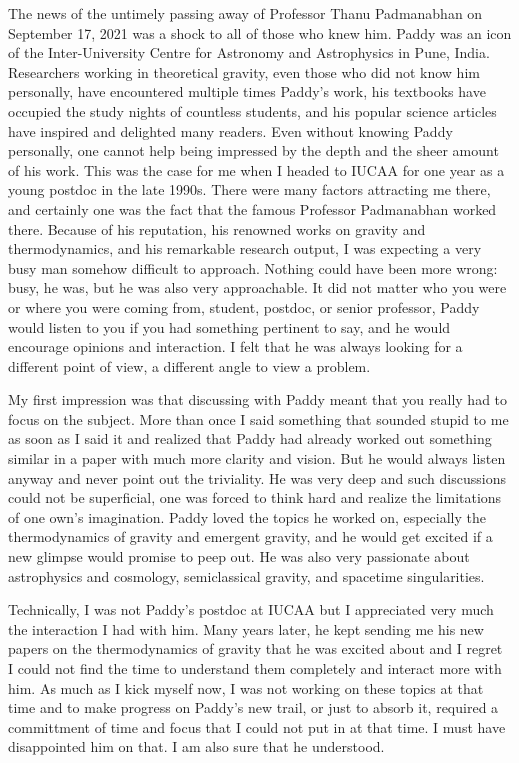 \documentclass[prd, preprint, longbibliography, 12pt]{revtex4-2}
\begin{document}
The news of the untimely passing away of Professor Thanu 
Padmanabhan  on 
September 17, 2021 was a shock to all 
of those who knew him. Paddy was an icon of the Inter-University Centre 
for Astronomy and Astrophysics in Pune, India. Researchers working in 
theoretical gravity, even those who did not know him personally, have 
encountered multiple times Paddy's work, his textbooks have occupied the 
study nights of countless students, and his popular science articles have 
inspired and delighted many readers. Even without knowing Paddy 
personally, one 
cannot help being impressed by the depth and the sheer amount of his work. 
This was the case for me when I headed to IUCAA for one year as a young 
postdoc in the late 1990s. There were many factors attracting me there, 
and certainly one was the fact that the famous Professor Padmanabhan 
worked there. Because of his reputation, his renowned works on gravity and 
thermodynamics, and his remarkable research output, I was expecting a very 
busy man somehow difficult to approach. Nothing could have been more 
wrong: busy, he was, but he was also very approachable. It did not matter 
who you were or where you were coming from, student, postdoc, or senior 
professor, Paddy would listen to you if you had something pertinent to 
say, and he would encourage opinions and interaction. I felt  
that he was always looking for a different point of view, a different 
angle to view a problem.

My first impression was that discussing with Paddy meant that you really 
had to focus on the subject. More than once I said something that sounded 
stupid to me as soon as I said it and realized that Paddy had already 
worked out something similar in a paper with much more clarity and vision. 
But he would always listen anyway and never point out the triviality. He 
was very deep and such discussions could not be superficial, one was 
forced to think hard and realize the limitations of one own's imagination. 
Paddy loved the topics he worked on, especially the thermodynamics of 
gravity and emergent gravity, and he would get excited if a new glimpse 
would promise to peep out. He was also very passionate about astrophysics 
and cosmology, semiclassical gravity, and spacetime singularities.

Technically, I was not Paddy's postdoc at IUCAA but I appreciated very 
much the interaction I had with him. Many years later, he kept sending me 
his new papers on the thermodynamics of gravity that he was excited about 
and I regret I could not find the time to understand them completely and 
interact more with him. As much as I kick myself now, I 
was not working on these topics at that time and to make progress on 
Paddy's new trail, or just to absorb it, required a committment of 
time and focus that I could not put in at that time. I must have 
disappointed him on that. I am also sure that he understood.
\end{document}

